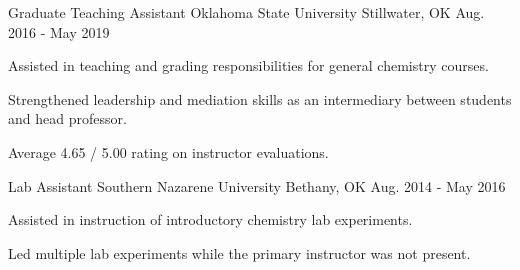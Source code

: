 

\begin{cventries}
	\vspace{-1mm}

  \cventry
    {Graduate Teaching Assistant} %
    {Oklahoma State University} %
    {Stillwater, OK} %
    {Aug. 2016 - May 2019} %
    {
      \begin{cvitems} %
        \item {Assisted in teaching and grading responsibilities for general chemistry courses.}
        \item{Strengthened leadership and mediation skills as an intermediary between students and head professor.}
        \item{Average 4.65 / 5.00 rating on instructor evaluations.}
        \vspace{-1.5mm}
      \end{cvitems}
    }


\cventry
{Lab Assistant} %
{Southern Nazarene University} %
{Bethany, OK} %
{Aug. 2014 - May 2016} %
{
	\begin{cvitems} %
		\item {Assisted in instruction of introductory chemistry lab experiments.}
		\item{Led multiple lab experiments while the primary instructor was not present.}
	\end{cvitems}
}


\end{cventries}
